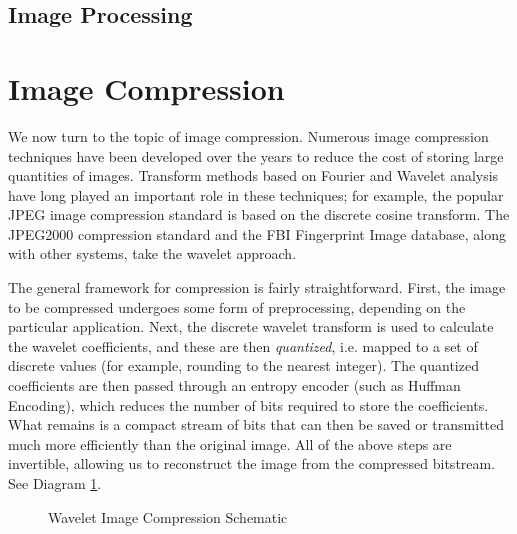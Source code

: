 \subsection*{Image Processing}

\section*{Image Compression}
We now turn to the topic of image compression.
Numerous image compression techniques
have been developed over the years to reduce the cost of storing large quantities of images.
Transform methods based on Fourier and Wavelet analysis
have long played an important role in these techniques;
for example, the popular JPEG image compression standard is based on
the discrete cosine transform.
The JPEG2000 compression standard and the FBI Fingerprint Image database, along with other systems,
take the wavelet approach.

The general framework for compression is fairly straightforward. First,
the image to be compressed undergoes some form of preprocessing,
depending on the particular application.
Next, the discrete wavelet transform is used to calculate
the wavelet coefficients, and these are then \textit{quantized},
i.e. mapped to a set of discrete values (for example, rounding to the nearest integer).
The quantized coefficients are
then passed through an entropy encoder (such as Huffman Encoding), which reduces
the number of bits required to store the coefficients.
What remains is a compact stream of bits
that can then be saved or transmitted much more efficiently than the
original image. All of the above steps are invertible, allowing us to
reconstruct the image from the compressed bitstream. See Diagram
\ref{tikz:wsqscheme}.

\begin{figure}
\centering
{}
\caption{Wavelet Image Compression Schematic}
\label{tikz:wsqscheme}
\end{figure}

